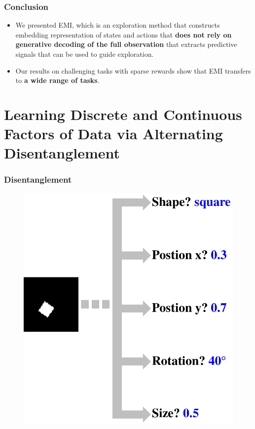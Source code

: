 \documentclass[10pt,mathserif]{beamer}
\begin{document}
\begin{frame}
\frametitle{Conclusion}
  \begin{itemize} \itemsep=16pt
      \item We presented EMI, which is an exploration method that constructs embedding representation of states and actions that \textbf{does not rely on generative decoding of the full observation} that extracts predictive signals that can be used to guide exploration.\pause
      \item Our results on challenging tasks with sparse rewards show that EMI transfers to \textbf{a wide range of tasks}.
  \end{itemize}
\end{frame}


\section{Learning Discrete and Continuous Factors of Data via Alternating Disentanglement}

\begin{frame}
\frametitle{Disentanglement}
\begin{figure}
\centering
\includegraphics[width=0.6\linewidth]{dis_asset/disentanglement}
\end{figure}
\end{frame}
\end{document}
